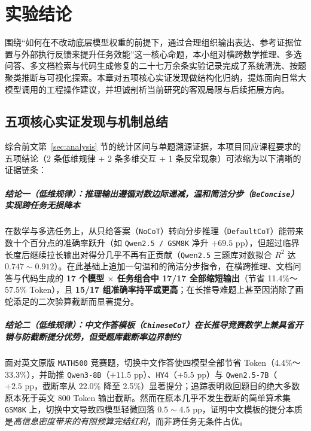\chapter{实验结论}\label{part:conclusions}

围绕“如何在不改动底层模型权重的前提下，通过合理组织输出表达、参考证据位置与外部执行反馈来提升任务效能”这一核心命题，本小组对横跨数学推理、多选问答、多文档检索与代码生成修复的二十七万余条实验记录完成了系统清洗、按题聚类推断与可视化探索。本章对五项核心实证发现做结构化归纳，提炼面向日常大模型调用的工程操作建议，并坦诚剖析当前研究的客观局限与后续拓展方向。

\section{五项核心实证发现与机制总结}

综合前文第~\ref{sec:analysis} 节的统计区间与单题溯源证据，本项目回应课程要求的五项结论（2 条低维规律 + 2 条多维交互 + 1 条反常现象）可浓缩为以下清晰的证据链条：

\paragraph{结论一（低维规律）：推理输出遵循对数边际递减，温和简洁分步（\texttt{BeConcise}）实现跨任务无损降本}在数学与多选任务上，从只给答案（\texttt{NoCoT}）转向分步推理（\texttt{DefaultCoT}）能带来数十个百分点的准确率跃升（如 \texttt{Qwen2.5 / GSM8K} 净升 $+69.5\text{ pp}$），但超过临界长度后继续拉长输出对得分几乎不再有正贡献（\texttt{Qwen2.5} 三题库对数拟合 $R^2$ 达 $0.747\sim 0.912$）。在此基础上追加一句温和的简洁分步指令，在横跨推理、文档问答与代码生成的 \textbf{17 个模型 $\times$ 任务组合中 17/17 全部缩短输出}（节省 11.4\%～57.5\% Token），且 \textbf{15/17 组准确率持平或更高}；在长推导难题上甚至因消除了画蛇添足的二次验算截断而显著提分。

\paragraph{结论二（低维规律）：中文作答模板（\texttt{ChineseCoT}）在长推导竞赛数学上兼具省开销与防截断提分优势，但受题库截断率边界制约}面对英文原版 \texttt{MATH500} 竞赛题，切换中文作答使四模型全部节省 Token（4.4\%～33.3\%），并助推 \texttt{Qwen3-8B}（$+11.5\text{ pp}$）、\texttt{HY4}（$+5.5\text{ pp}$）与 \texttt{Qwen2.5-7B}（$+2.5\text{ pp}$，截断率从 22.0\% 降至 2.5\%）显著提分；追踪表明救回题目的绝大多数原本死于英文 800 Token 输出截断。然而在原本几乎不发生截断的简单算术集 \texttt{GSM8K} 上，切换中文导致四模型轻微回落 $0.5\sim 4.5\text{ pp}$，证明中文模板的提分本质是\emph{高信息密度带来的有限预算完结红利}，而非跨任务无条件占优。

